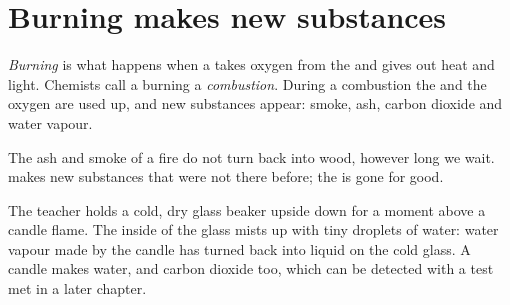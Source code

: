 \section{Burning makes new substances}

\begin{definition}\label{def:g4:what-a-fire-needs:burning}
\emph{Burning} is what happens when a  takes oxygen
from the  and gives out heat and light. Chemists call a burning a
\emph{combustion}. During a combustion the  and
the oxygen are used up, and new substances appear: smoke, ash, carbon
dioxide and water vapour.
\end{definition}

\begin{proposition}\label{prop:g4:what-a-fire-needs:new}
The ash and smoke of a fire do not turn back into wood, however long we
wait.  makes new substances that were not there before; the 
is gone for good.
\end{proposition}

\begin{inthelab}
The teacher holds a cold, dry glass beaker upside down for a moment above
a candle flame. The inside of the glass mists up with tiny droplets of
water: water vapour made by the  candle has turned back into
liquid on the cold glass. A  candle makes water, and carbon
dioxide too, which can be detected with a test met in a later chapter.
\end{inthelab}

